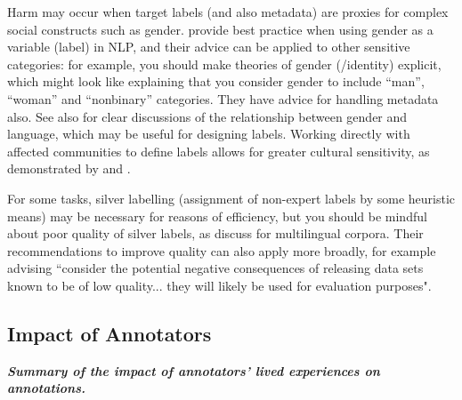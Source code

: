Harm may occur when target labels (and also metadata) are proxies for complex social constructs such as gender. 
\citet{larson_gender_2017} provide best practice when using gender as a variable (label) in NLP, and their advice can be applied to other sensitive categories: for example, you should make theories of gender (/identity) explicit, which might look like explaining that you consider gender to include ``man'', ``woman'' and ``nonbinary'' categories. They have advice for handling metadata also.
See also \citet{savoldi_gender_2021, dev_harms_2021} for clear discussions of the relationship between gender and language, which may be useful for designing labels.
Working directly with affected communities to define labels allows for greater cultural sensitivity, as demonstrated by \citet{maronikolakis_listening_2022} and \citet{dev_building_2024}. 

For some tasks, silver labelling (assignment of non-expert labels by some heuristic means)  may be necessary for reasons of efficiency, but you should be mindful about poor quality of silver labels, as \citet{lignos_toward_2022} discuss for multilingual corpora.  Their recommendations to improve quality can also apply more broadly, for example advising ``consider the potential negative consequences of releasing data sets known to be of low quality... they will likely be used for evaluation purposes". 


\subsection{Impact of Annotators}
\noindent\textbf{\textit{Summary of the impact of annotators' lived experiences on annotations.}}
\newline 

